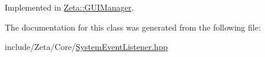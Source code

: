 Implemented in \hyperlink{classZeta_1_1GUIManager_a2d19f5a925049f6ce166e223442834c6}{Zeta\+::\+G\+U\+I\+Manager}.



The documentation for this class was generated from the following file\+:\begin{DoxyCompactItemize}
\item 
include/\+Zeta/\+Core/\hyperlink{SystemEventListener_8hpp}{System\+Event\+Listener.\+hpp}\end{DoxyCompactItemize}
